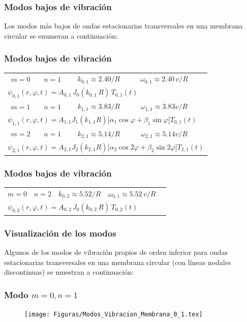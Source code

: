 \begin{frame}
\frametitle{Modos bajos de vibración}
Los modos más bajos de ondas estacionarias transversales en una membrana circular se enumeran a continuación:
\end{frame}
\begin{frame}
\frametitle{Modos bajos de vibración}
\fontsize{10}{10}\selectfont
\begin{table}[H]
\centering
\begin{tabular}{c c c c l}
$m {=} 0$ & $n {=} 1$ & $k_{0,1} {\approx} 2.40/R$ & $\omega_{0,1} {\approx} 2.40 \, v/R$ & \\[0.5em] 
\multicolumn{5}{l}{$\psi_{0,1}(r, \varphi, t) {=} A_{0,1} \, J_{0}(k_{0,1} \, R) \, T_{0,1}(t)$} \\[0.5em] \hline
$m {=} 1$ & $n {=} 1$ & $k_{1,1} {\approx} 3.83/R$ & $\omega_{1,1} {\approx} 3.83 v/R$ & \\[0.5em]
\multicolumn{5}{l}{$\psi_{1,1}(r, \varphi, t) {=} A_{1,1} J_{1}(k_{1,1} R) \big[ \alpha_{1} \cos \varphi {+} \beta_{1} \sin \varphi \big] T_{0,1}(t)$} \\[0.5em] \hline
$m {=} 2$ & $n {=} 1$ & $k_{2,1} {\approx} 5.14/R$ & $\omega_{2,1} {\approx} 5.14 v/R$ & \\[0.5em]
\multicolumn{5}{l}{$\psi_{2,1}(r, \varphi, t) {=} A_{2,1} J_{2}(k_{2,1} R) \big[ \alpha_{2} \cos 2 \varphi {+} \beta_{2} \sin 2 \varphi \big] T_{2,1}(t)$}
\end{tabular}
\end{table}
\end{frame}
\begin{frame}
\frametitle{Modos bajos de vibración}
\fontsize{10}{10}\selectfont
\begin{table}[H]
\centering
\begin{tabular}{c c c c l}
$m {=} 0$ & $n {=} 2$ & $k_{0,2} {\approx} 5.52/R$ & $\omega_{0,1} {\approx} 5.52 \, v/R$ & \\[0.5em]
\multicolumn{5}{l}{$\psi_{0,2}(r, \varphi, t) {=} A_{0,2} \, J_{0}(k_{0,2} \, R) \, T_{0,2}(t)$}
\end{tabular}
\end{table}
\end{frame}
\begin{frame}
\frametitle{Visualización de los modos}
Algunos de los modos de vibración propios de orden inferior para ondas estacionarias transversales en una membrana circular (con líneas nodales discontinuas) se muestran a continuación:
\end{frame}
\begin{frame}
\frametitle{Modo $m=0, n=1$}
\begin{figure}
    \centering
    \texttt{[image: Figuras/Modos\_Vibracion\_Membrana\_0\_1.tex]}
\end{figure}
\end{frame}
